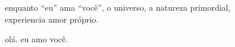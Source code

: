 enquanto ``eu'' ama ``você'', o universo, a natureza primordial,\\
experiencia amor próprio.

olá. eu amo você.
